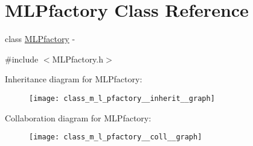 \hypertarget{class_m_l_pfactory}{
\section{MLPfactory Class Reference}
\label{class_m_l_pfactory}
}


class \hyperlink{class_m_l_pfactory}{MLPfactory} -\/  




{\ttfamily \#include $<$MLPfactory.h$>$}



Inheritance diagram for MLPfactory:
\nopagebreak
\begin{figure}[H]
\begin{center}
\leavevmode
\texttt{[image: class\_m\_l\_pfactory\_\_inherit\_\_graph]}
\end{center}
\end{figure}


Collaboration diagram for MLPfactory:
\nopagebreak
\begin{figure}[H]
\begin{center}
\leavevmode
\texttt{[image: class\_m\_l\_pfactory\_\_coll\_\_graph]}
\end{center}
\end{figure}
